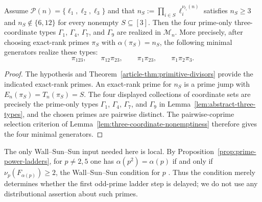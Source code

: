 \begin{corollary}
\label{cor:primitive-three-skeleton}
Assume $\mathcal P(n)=\{\ell_1,\ell_2,\ell_3\}$ and that
$n_S:=\prod_{i\in S}\ell_i^{\nu_{\ell_i}(n)}$ satisfies
$n_S\ge 3$ and $n_S\notin\{6,12\}$ for every nonempty
$S\subseteq[3]$. Then the four prime-only three-coordinate
types $\Gamma_1$, $\Gamma_4$, $\Gamma_7$, and $\Gamma_9$ are realized in
$\mathcal M_n$. More precisely, after choosing exact-rank primes
$\pi_S$ with $\alpha(\pi_S)=n_S$, the following minimal generators realize
these types:
\[
\pi_{123},\qquad
\pi_{12}\pi_{23},\qquad
\pi_1\pi_{23},\qquad
\pi_1\pi_2\pi_3 .
\]
\end{corollary}

\begin{proof}
The hypothesis and Theorem~\ref{article-thm:primitive-divisors} provide the indicated
exact-rank primes. An exact-rank prime for $n_S$ is a prime jump with
$E_n(\pi_S)=T_n(\pi_S)=S$. The four displayed collections of coordinate
sets are precisely the prime-only types $\Gamma_1$, $\Gamma_4$,
$\Gamma_7$, and $\Gamma_9$ in Lemma~\ref{lem:abstract-three-types}, and
the chosen primes are pairwise distinct. The
pairwise-coprime selection criterion of
Lemma~\ref{lem:three-coordinate-nonemptiness} therefore gives the four
minimal generators.
\end{proof}

\begin{remark}\label{rem:wss}
The only Wall--Sun--Sun input needed here is local.  By
Proposition~\ref{prop:prime-power-ladders}, for $p\neq 2,5$ one has
$\alpha(p^2)=\alpha(p)$ if and only if $\nu_p(F_{\alpha(p)})\ge 2$, the
Wall--Sun--Sun condition for $p$ \cite{SunSun1992FibonacciFLT}.  Thus the
condition merely determines whether the first odd-prime ladder step is delayed;
we do not use any distributional assertion about such primes.
\end{remark}

